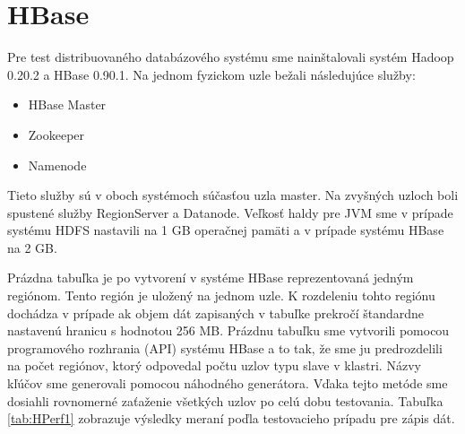\documentclass[11pt,twoside,a4paper]{book}
\begin{document}

\section{HBase}

Pre test distribuovaného databázového systému sme nainštalovali systém Hadoop 0.20.2 a HBase 0.90.1. Na jednom fyzickom uzle bežali následujúce služby:

\begin{itemize}
 \item HBase Master
 \item Zookeeper
 \item Namenode 
\end{itemize}

Tieto služby sú v oboch systémoch súčasťou uzla master. Na zvyšných uzloch boli spustené služby RegionServer a Datanode. Veľkosť haldy pre JVM sme v prípade systému HDFS nastavili na 1 GB operačnej pamäti a v prípade systému HBase na 2 GB.

Prázdna tabuľka je po vytvorení v systéme HBase reprezentovaná  jedným regiónom. Tento región je uložený na jednom uzle. K rozdeleniu tohto regiónu dochádza v prípade ak objem dát zapisaných v tabuľke prekročí štandardne nastavenú hranicu s hodnotou 256 MB. Prázdnu tabuľku sme vytvorili pomocou programového rozhrania (API) systému HBase a to tak, že sme ju predrozdelili na počet regiónov, ktorý odpovedal počtu uzlov typu slave v klastri. Názvy kľúčov sme generovali pomocou náhodného generátora. Vďaka tejto metóde sme dosiahli rovnomerné zaťaženie všetkých uzlov po celú dobu testovania. Tabuľka \ref{tab:HPerf1} zobrazuje výsledky meraní poďla testovacieho prípadu pre zápis dát. 


 
\end{document}
